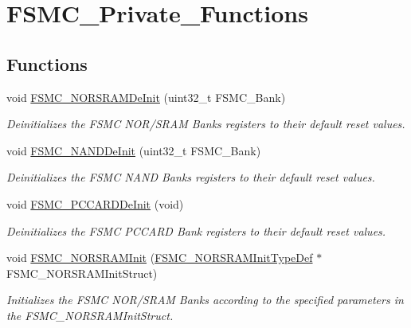 \hypertarget{group___f_s_m_c___private___functions}{}\section{F\+S\+M\+C\+\_\+\+Private\+\_\+\+Functions}
\label{group___f_s_m_c___private___functions}
\subsection*{Functions}
\begin{DoxyCompactItemize}
\item 
void \mbox{\hyperlink{group___f_s_m_c___private___functions_gaab3e6648e8a584e73785361ac960eded}{F\+S\+M\+C\+\_\+\+N\+O\+R\+S\+R\+A\+M\+De\+Init}} (uint32\+\_\+t F\+S\+M\+C\+\_\+\+Bank)
\begin{DoxyCompactList}\small\item\em Deinitializes the F\+S\+MC N\+O\+R/\+S\+R\+AM Banks registers to their default reset values. \end{DoxyCompactList}\item 
void \mbox{\hyperlink{group___f_s_m_c___private___functions_gafb749503293474a68555961bd8f120e1}{F\+S\+M\+C\+\_\+\+N\+A\+N\+D\+De\+Init}} (uint32\+\_\+t F\+S\+M\+C\+\_\+\+Bank)
\begin{DoxyCompactList}\small\item\em Deinitializes the F\+S\+MC N\+A\+ND Banks registers to their default reset values. \end{DoxyCompactList}\item 
void \mbox{\hyperlink{group___f_s_m_c___private___functions_ga2f53ccf3a4f3c80a5a56fb47ccd47ccd}{F\+S\+M\+C\+\_\+\+P\+C\+C\+A\+R\+D\+De\+Init}} (void)
\begin{DoxyCompactList}\small\item\em Deinitializes the F\+S\+MC P\+C\+C\+A\+RD Bank registers to their default reset values. \end{DoxyCompactList}\item 
void \mbox{\hyperlink{group___f_s_m_c___private___functions_ga9c27816e8b17394c9ee1ce9298917b4a}{F\+S\+M\+C\+\_\+\+N\+O\+R\+S\+R\+A\+M\+Init}} (\mbox{\hyperlink{struct_f_s_m_c___n_o_r_s_r_a_m_init_type_def}{F\+S\+M\+C\+\_\+\+N\+O\+R\+S\+R\+A\+M\+Init\+Type\+Def}} $\ast$F\+S\+M\+C\+\_\+\+N\+O\+R\+S\+R\+A\+M\+Init\+Struct)
\begin{DoxyCompactList}\small\item\em Initializes the F\+S\+MC N\+O\+R/\+S\+R\+AM Banks according to the specified parameters in the F\+S\+M\+C\+\_\+\+N\+O\+R\+S\+R\+A\+M\+Init\+Struct. \end{DoxyCompactList}\item 

\end{DoxyCompactItemize}
